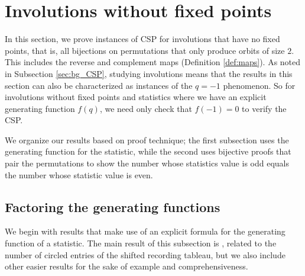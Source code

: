 \documentclass{amsart}
\theoremstyle{definition}
\begin{document}
\section{Involutions without fixed points}

\label{sec:rev_comp}

In this section, we prove instances of CSP for involutions that have no fixed points, that is, all bijections on permutations that only produce orbits of size $2$.
This includes the reverse and complement maps (Definition \ref{def:maps}). As noted in Subsection \ref{sec:bg_CSP}, studying involutions means that the results in this section can also be characterized as instances of the $q=-1$ phenomenon. So for involutions without fixed points and statistics where we have an explicit generating function $f(q)$, we need only check that $f(-1)=0$ to verify the CSP.  


We organize our results based on proof technique; the first subsection uses the generating function for the statistic, while the second uses bijective proofs that pair the permutations to show the number whose statistics value is odd  equals the number whose statistic value is even. 


\subsection{Factoring the generating functions}
We begin with results that make use of an explicit formula for the generating function of a statistic. The main result of this subsection is , related to the number of circled entries of the shifted recording tableau, but we also include other easier results for the sake of example and comprehensiveness. 
\end{document}
